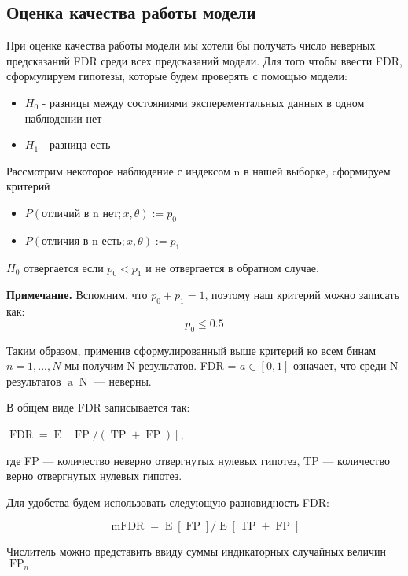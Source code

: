 \documentclass{matmex-diploma-custom}
\begin{document}
\subsection{Оценка качества работы модели}

При оценке качества работы модели мы хотели бы получать число неверных предсказаний FDR\cite{wiki:fdr} среди всех предсказаний модели. Для того чтобы ввести FDR, сформулируем гипотезы, которые будем проверять с помощью модели: 

\begin{itemize}
  \item $H_0$ - разницы между состояниями эксперементальных данных в одном наблюдении нет
  \item $H_1$ - разница есть
\end{itemize}

Рассмотрим некоторое наблюдение с индексом n в нашей выборке, cформируем критерий

\begin{itemize}
  \item $P(\textrm{отличий в n нет}; x, \theta) := p_0$
  \item $P(\textrm{отличия в n есть};x, \theta) := p_1$
\end{itemize}

$H_0$ отвергается если $p_0 < p_1$ и не отвергается в обратном случае. 

\textbf{Примечание.} Вспомним, что $p_0 + p_1 = 1$, поэтому наш критерий можно записать как:
$$p_0 \le 0.5$$

Таким образом, применив сформулированный выше критерий ко всем бинам $n = 1,..., N$ мы получим N результатов. FDR = $a \in [0, 1]$ означает, что среди N результатов $\operatorname{a}\operatorname{N}$ — неверны.

В общем виде FDR записывается так:

$\operatorname{FDR} = \operatorname{E}[\operatorname{FP} / (\operatorname{TP} + \operatorname{FP})]$,

где FP — количество неверно отвергнутых нулевых гипотез, TP — количество верно отвергнутых нулевых гипотез.

Для удобства будем использовать следующую разновидность FDR:

\begin{equation}\operatorname{mFDR} = \operatorname{E}[\operatorname{FP}] / \operatorname{E}[\operatorname{TP} + \operatorname{FP}]\end{equation}

Числитель можно представить ввиду суммы индикаторных случайных величин $\operatorname{FP}_n$
\end{document}
